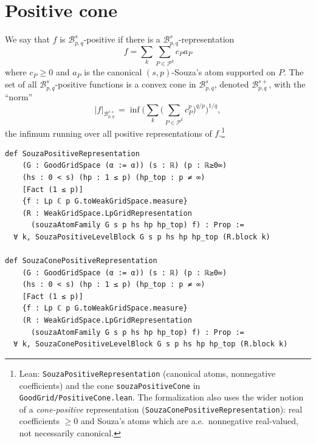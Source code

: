 \documentclass[11pt]{amsart}
\theoremstyle{definition}
\newcommand{\lean}[1]{\texttt{#1}}
\begin{document}
\section{Positive cone}\label{positivesec}

We say that $f$ is $\mathcal{B}^s_{p,q}$-positive if there is a
$\mathcal{B}^s_{p,q}$-representation
$$f= \sum_k \sum_{P\in \mathcal{P}^k} c_Pa_P$$
where $c_P\geq 0$ and $a_P$ is the canonical $(s,p)$-Souza's atom supported on
$P$. The set of all $\mathcal{B}^s_{p,q}$-positive functions is a convex cone
in $\mathcal{B}^s_{p,q}$, denoted $\mathcal{B}^{s+}_{p,q}$, with the
``norm''
$$|f|_{\mathcal{B}^{s+}_{p,q}}=\inf \Big( \sum_k \big( \sum_{P\in \mathcal{P}^k} c_P^p \big)^{q/p} \Big)^{1/q},$$
the infimum running over all positive representations of
$f$.\footnote{Lean: \lean{SouzaPositiveRepresentation} (canonical atoms,
nonnegative coefficients) and the cone \lean{souzaPositiveCone} in
\lean{GoodGrid/PositiveCone.lean}. The formalization also uses the wider
notion of a \emph{cone-positive} representation
(\lean{SouzaConePositiveRepresentation}): real coefficients $\geq 0$ and
Souza's atoms which are a.e.\ nonnegative real-valued, not necessarily
canonical.}
\begin{lstlisting}[style=lean]
def SouzaPositiveRepresentation
    (G : GoodGridSpace (α := α)) (s : ℝ) (p : ℝ≥0∞)
    (hs : 0 < s) (hp : 1 ≤ p) (hp_top : p ≠ ∞)
    [Fact (1 ≤ p)]
    {f : Lp ℂ p G.toWeakGridSpace.measure}
    (R : WeakGridSpace.LpGridRepresentation
      (souzaAtomFamily G s p hs hp hp_top) f) : Prop :=
  ∀ k, SouzaPositiveLevelBlock G s p hs hp hp_top (R.block k)

def SouzaConePositiveRepresentation
    (G : GoodGridSpace (α := α)) (s : ℝ) (p : ℝ≥0∞)
    (hs : 0 < s) (hp : 1 ≤ p) (hp_top : p ≠ ∞)
    [Fact (1 ≤ p)]
    {f : Lp ℂ p G.toWeakGridSpace.measure}
    (R : WeakGridSpace.LpGridRepresentation
      (souzaAtomFamily G s p hs hp hp_top) f) : Prop :=
  ∀ k, SouzaConePositiveLevelBlock G s p hs hp hp_top (R.block k)
\end{lstlisting}
\end{document}
